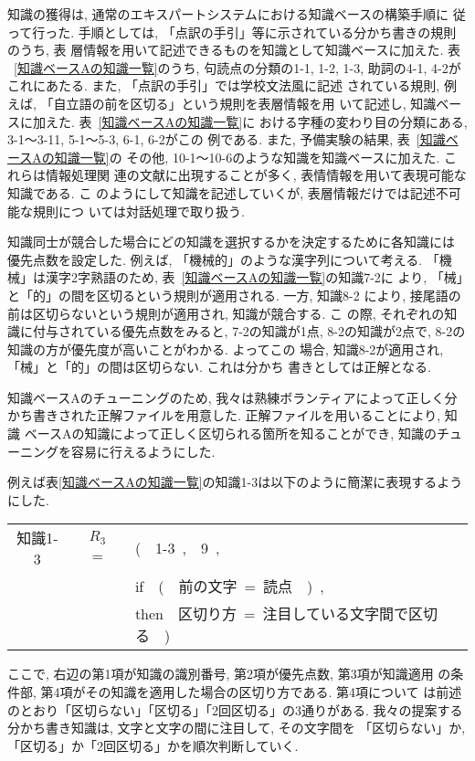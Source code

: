 知識の獲得は, 通常のエキスパートシステムにおける知識ベースの構築手順に
従って行った. 
手順としては, 「点訳の手引」等に示されている分かち書きの規則のうち, 表
層情報を用いて記述できるものを知識として知識ベースに加えた. 表
~\ref{知識ベースAの知識一覧}のうち, 句読点の分類の1-1, 1-2, 1-3, 
助詞の4-1, 4-2がこれにあたる. また, 「点訳の手引」では学校文法風に記述
されている規則, 例えば, 「自立語の前を区切る」という規則を表層情報を用
いて記述し, 知識ベースに加えた. 表~\ref{知識ベースAの知識一覧}に
おける字種の変わり目の分類にある, 3-1〜3-11, 5-1〜5-3, 6-1, 6-2がこの
例である. また, 予備実験の結果, 表~\ref{知識ベースAの知識一覧}の
その他, 10-1〜10-6のような知識を知識ベースに加えた. これらは情報処理関
連の文献に出現することが多く, 表情情報を用いて表現可能な知識である. こ
のようにして知識を記述していくが, 表層情報だけでは記述不可能な規則につ
いては対話処理で取り扱う. 

知識同士が競合した場合にどの知識を選択するかを決定するために各知識には
優先点数を設定した. 例えば, 「機械的」のような漢字列について考える. 
「機械」は漢字2字熟語のため, 表~\ref{知識ベースAの知識一覧}の知識7-2に
より, 「械」と「的」の間を区切るという規則が適用される. 一方, 知識8-2
により, 接尾語の前は区切らないという規則が適用され, 知識が競合する. こ
の際, それぞれの知識に付与されている優先点数をみると, 7-2の知識が1点, 
8-2の知識が2点で, 8-2の知識の方が優先度が高いことがわかる. よってこの
場合, 知識8-2が適用され, 「械」と「的」の間は区切らない. これは分かち
書きとしては正解となる. 

知識ベースAのチューニングのため, 我々は熟練ボランティアによって正しく分かち書きされた正解ファイルを用意した. 
正解ファイルを用いることにより, 知識
ベースAの知識によって正しく区切られる箇所を知ることができ, 知識のチューニングを容易に行えるようにした. 


例えば表\ref{知識ベースAの知識一覧}の知識1-3は以下のように簡潔に表現するようにした. 

\hspace*{0.1em}
\begin{tabular}{cclp{2cm}}
{知識1-3} & {\(R_3\) ~=~} & {(~~1-3~,~~9~,}\\
& & {if~~(~~前の文字~=~読点~~)~,}\\
& & {then~~区切り方~=~注目している文字間で区切る~~)}\\
\end{tabular}

ここで, 右辺の第1項が知識の識別番号, 第2項が優先点数, 第3項が知識適用
の条件部, 第4項がその知識を適用した場合の区切り方である. 第4項について
は前述のとおり「区切らない」「区切る」「2回区切る」の3通りがある. 
我々の提案する分かち書き知識は, 文字と文字の間に注目して, その文字間を
「区切らない」か, 「区切る」か「2回区切る」かを順次判断していく. 

